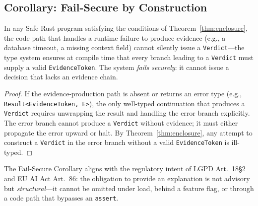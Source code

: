 \subsection{Corollary: Fail-Secure by Construction}
\label{sec:corollary}

\begin{corollary}
\label{cor:failsecure}
In any Safe Rust program satisfying the conditions of
Theorem~\ref{thm:enclosure}, the code path that handles a runtime
failure to produce evidence (e.g., a database timeout, a missing
context field) cannot silently issue a \texttt{Verdict}---the type
system ensures at compile time that every branch leading to a
\texttt{Verdict} must supply a valid \texttt{EvidenceToken}.
The system \emph{fails securely}: it cannot issue a decision that
lacks an evidence chain.
\end{corollary}

\begin{proof}
If the evidence-production path is absent or returns an error type
(e.g., \texttt{Result<EvidenceToken, E>}), the only well-typed
continuation that produces a \texttt{Verdict} requires unwrapping
the result and handling the error branch explicitly.  The error
branch cannot produce a \texttt{Verdict} without evidence; it must
either propagate the error upward or halt.  By
Theorem~\ref{thm:enclosure}, any attempt to construct a
\texttt{Verdict} in the error branch without a valid
\texttt{EvidenceToken} is ill-typed.
\end{proof}

The Fail-Secure Corollary aligns with the regulatory intent of
LGPD Art.~18\S2 and EU AI Act Art.~86: the obligation to provide an
explanation is not advisory but \emph{structural}---it cannot be
omitted under load, behind a feature flag, or through a code path
that bypasses an \texttt{assert}.
